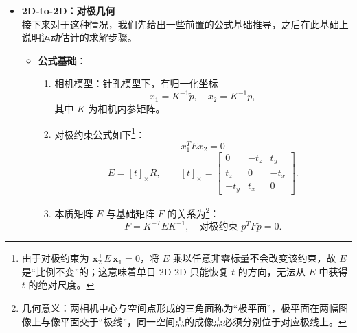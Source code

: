 \documentclass[../main.tex]{subfiles}
\begin{document}
\begin{enumerate}
\begin{itemize}
\begin{enumerate}
\begin{itemize}
\begin{itemize}
        \item \textbf{2D-to-2D：对极几何}
        \\接下来对于这种情况，我们先给出一些前置的公式基础推导，之后在此基础上说明运动估计的求解步骤。
        \begin{itemize}
            \item \textbf{公式基础}：
                \begin{enumerate}
                    \item 相机模型：针孔模型下，有归一化坐标
                    \[
                    x_1 = K^{-1} \tilde{p}, \quad x_2 = K^{-1} p,
                    \]
                    其中 $K$ 为相机内参矩阵。
                    \item 对极约束公式如下\footnote{由于对极约束为 \( \mathbf{x}_2^\top E\,\mathbf{x}_1 = 0\)，将 \(E\) 乘以任意非零标量不会改变该约束，故 \(E\) 是“比例不变”的；这意味着单目 2D-2D 只能恢复 \(t\) 的方向，无法从 \(E\) 中获得 \(t\) 的绝对尺度。}：
                    \[
                    x_1^T E x_2 = 0
                    \]
                    \[
                    E = [t]_\times R,\qquad
                    [t]_\times =
                    \begin{bmatrix}
                    0 & -t_z & t_y\\
                    t_z & 0 & -t_x\\
                    -t_y & t_x & 0
                    \end{bmatrix}.
                    \]
                    \item 本质矩阵 $E$ 与基础矩阵 $F$ 的关系为\footnote{几何意义：两相机中心与空间点形成的三角面称为“极平面”，极平面在两幅图像上与像平面交于“极线”，同一空间点的成像点必须分别位于对应极线上。}：
                    \[
                    F = K^{-T} E K^{-1}, \quad \text{对极约束 } p^T F \tilde{p} = 0.
                    \]
            \end{enumerate}


\end{itemize}
\end{itemize}
\end{itemize}
\end{enumerate}
\end{itemize}
\end{enumerate}
\end{document}
